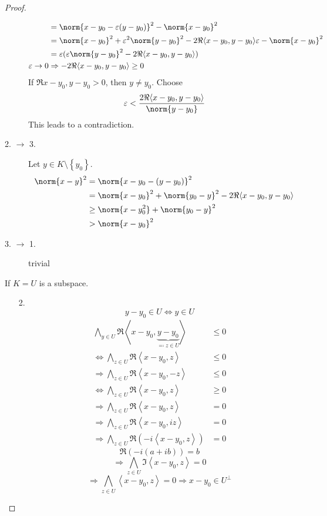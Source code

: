 \documentclass[a4paper,landscape,twocolumn]{article}
\newcommand\set[1]{\left\{#1\right\}}
\newcommand\functional[1]{\left\langle{#1}\right\rangle}
\theoremstyle{definition}
\DeclarePairedDelimiter\norm\lVert\rVert
\begin{document}
\begin{proof}
\begin{description}
\begin{align*}
          &= \norm{x - y_0 - \varepsilon (y - y_0)}^2 - \norm{x - y_0}^2 \\
          &= \norm{x - y_0}^2 + \varepsilon^2 \norm{y - y_0}^2 - 2 \Re{\functional{x - y_0, y - y_0}} \varepsilon - \norm{x - y_0}^2 \\
          &= \varepsilon(\varepsilon \norm{y - y_0}^2 - 2 \Re{\functional{x - y_0, y - y_0}}) \\
        \varepsilon \to 0 & \Rightarrow -2 \Re{\functional{x - y_0, y - y_0}} \geq 0
      \end{align*}
      If $\Re{x - y_0, y - y_0} > 0$, then $y \neq y_0$. Choose
      \[ \varepsilon < \frac{2\Re{\functional{x - y_0, y - y_0}}}{\norm{y - y_0}} \]
      This leads to a contradiction.
    \item[2. $\rightarrow$ 3.]
      Let $y \in K \setminus \set{y_0}$.
      \begin{align*}
        \norm{x - y}^2 &= \norm{x - y_0 - (y - y_0)}^2 \\
          &= \norm{x - y_0}^2 + \norm{y_0 - y}^2 - 2 \Re{\functional{x - y_0, y - y_0}} \\
          &\geq \norm{x - y_0^2} + \norm{y_0 - y}^2 \\
          &> \norm{x - y_0}^2
      \end{align*}
    \item[3. $\rightarrow$ 1.]
      trivial
  \end{description}

  If $K = U$ is a subspace.
  \begin{enumerate}
    \item[2.]
    \[ y - y_0 \in U \Leftrightarrow y \in U \]
      \begin{align*}
        \bigwedge_{y \in U} \Re{\functional{x - y_0, \underbrace{y - y_0}_{\eqqcolon z \in U}}} &\leq 0 \\
        \Leftrightarrow \bigwedge_{z \in U} \Re{\functional{x - y_0, z}} &\leq 0 \\
        \Rightarrow \bigwedge_{z \in U} \Re{\functional{x - y_0, -z}} &\leq 0 \\
        \Leftrightarrow \bigwedge_{z \in U} \Re{\functional{x - y_0, z}} &\geq 0 \\
        \Rightarrow \bigwedge_{z \in U} \Re{\functional{x - y_0, z}} &= 0 \\
        \Rightarrow \bigwedge_{z \in U} \Re{\functional{x - y_0, iz}} &= 0 \\
        \Rightarrow \bigwedge_{z \in U} \Re{(-i \functional{x - y_0, z})} &= 0
      \end{align*}
      \[ \Re(-i (a + ib)) = b \]
      \[ \Rightarrow \bigwedge_{z \in U} \Im\functional{x - y_0, z} = 0 \]
      \[ \Rightarrow \bigwedge_{z \in U} \functional{x - y_0, z} = 0 \Rightarrow x - y_0 \in U^\bot \]
  \end{enumerate}
\end{proof}
\end{document}
